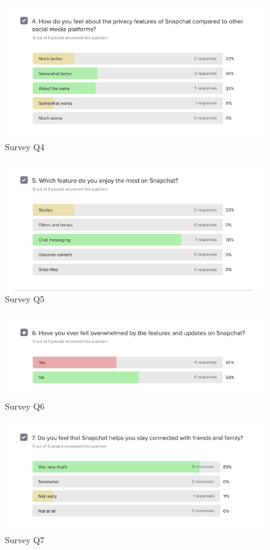 \documentclass{article}
\begin{document}
\newpage
\begin{figure}[h!]
    \centering
    \includegraphics[scale=0.6]{survey figure 4.png}
    \caption{Survey Q4}
    \label{fig:label}
\end{figure}

\begin{figure}[h!]
    \centering
    \includegraphics[scale=0.6]{survey figure 5.png}
    \caption{Survey Q5}
    \label{fig:label}
\end{figure}

\begin{figure}[h!]
    \centering
    \includegraphics[scale=0.6]{survey figure 6.png}
    \caption{Survey Q6}
    \label{fig:label}
\end{figure}

\newpage
\begin{figure}[h!]
    \centering
    \includegraphics[scale=0.6]{survey figure 7.png}
    \caption{Survey Q7}
    \label{fig:label}
\end{figure}
\end{document}
